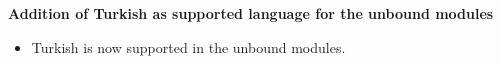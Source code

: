 \textbf{Addition of Turkish as supported language for the unbound modules}
\begin{itemize}
\item Turkish is now supported in the unbound modules.
\end{itemize}
